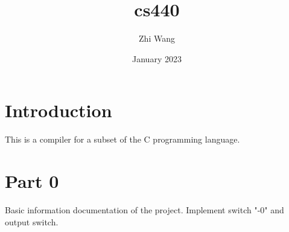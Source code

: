 \documentclass{article}
\title{cs440}
\author{Zhi Wang}
\date{January 2023}
\begin{document}
\maketitle

\section{Introduction}
This is a compiler for a subset of the C programming language.


\section{Part 0}
Basic information documentation of the project.
Implement switch "-0" and output switch.
\end{document}
